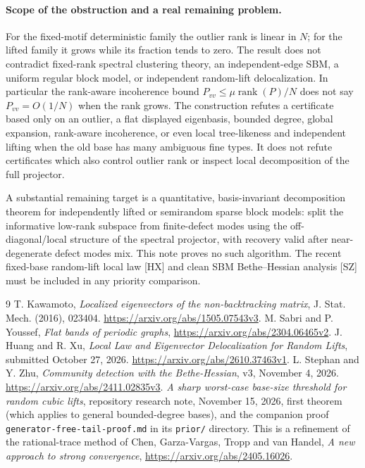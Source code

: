\documentclass[11pt]{article}
\begin{document}
\paragraph{Scope of the obstruction and a real remaining problem.}
For the fixed-motif deterministic family the outlier rank is linear in $N$;
for the lifted family it grows while its fraction tends to zero. The result does not
contradict fixed-rank spectral clustering theory, an independent-edge SBM,
a uniform regular block model, or independent random-lift delocalization.
In particular the rank-aware incoherence bound
$P_{vv}\leq\mu\operatorname{rank}(P)/N$ does not say $P_{vv}=O(1/N)$
when the rank grows. The construction refutes a certificate based only on
an outlier, a flat displayed eigenbasis, bounded degree, global expansion,
rank-aware incoherence, or even local tree-likeness and independent lifting
when the old base has many ambiguous fine types. It does not refute certificates which also
control outlier rank or inspect local decomposition of the full projector.

A substantial remaining target is a quantitative, basis-invariant
decomposition theorem for independently lifted or semirandom sparse block
models: split the informative low-rank subspace from finite-defect modes
using the off-diagonal/local structure of the spectral projector, with
recovery valid after near-degenerate defect modes mix. This note proves no
such algorithm. The recent fixed-base random-lift local law [HX] and clean
SBM Bethe--Hessian analysis [SZ] must be included in any priority comparison.

\begin{thebibliography}{9}
 T. Kawamoto, \emph{Localized eigenvectors of the non-backtracking
matrix}, J. Stat. Mech. (2016), 023404.
\url{https://arxiv.org/abs/1505.07543v3}.
 M. Sabri and P. Youssef, \emph{Flat bands of periodic graphs},
\url{https://arxiv.org/abs/2304.06465v2}.
 J. Huang and R. Xu, \emph{Local Law and Eigenvector
Delocalization for Random Lifts}, submitted October 27, 2026.
\url{https://arxiv.org/abs/2610.37463v1}.
 L. Stephan and Y. Zhu, \emph{Community detection with the
Bethe-Hessian}, v3, November 4, 2026.
\url{https://arxiv.org/abs/2411.02835v3}.
 \emph{A sharp worst-case base-size threshold for random cubic
lifts}, repository research note, November 15, 2026, first theorem
(which applies to general bounded-degree bases), and the companion proof
\texttt{generator-free-tail-proof.md} in its \texttt{prior/} directory.
This is a refinement of the rational-trace method of Chen, Garza-Vargas,
Tropp and van Handel, \emph{A new approach to strong convergence},
\url{https://arxiv.org/abs/2405.16026}.
\end{thebibliography}
\end{document}
